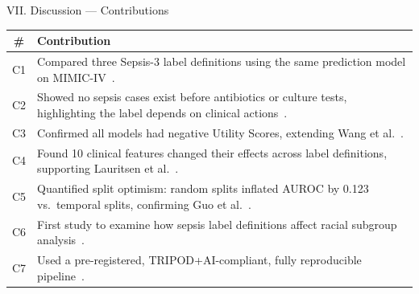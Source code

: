\begin{frame}{VII. Discussion --- Contributions}
\footnotesize\renewcommand{\arraystretch}{1.15}
\begin{center}
\begin{tabular}{cp{11cm}}
\toprule
\textbf{\#} & \textbf{Contribution} \\
\midrule
C1 & Compared three Sepsis-3 label definitions using the same prediction
     model on MIMIC-IV~\cite{cohen2024subtle}. \\
C2 & Showed no sepsis cases exist before antibiotics or culture tests,
     highlighting the label depends on clinical
     actions~\cite{kamran2024evaluation}. \\
C3 & Confirmed all models had negative Utility Scores, extending
     Wang et al.~\cite{wang2025srpm}. \\
C4 & Found 10 clinical features changed their effects across label
     definitions, supporting Lauritsen et al.~\cite{lauritsen2021framing}. \\
C5 & Quantified split optimism: random splits inflated AUROC by 0.123
     vs.\ temporal splits, confirming Guo et al.~\cite{guo2022temporal}. \\
C6 & First study to examine how sepsis label definitions affect racial
     subgroup analysis~\cite{wang2022equity}. \\
C7 & Used a pre-registered, TRIPOD+AI-compliant, fully reproducible
     pipeline~\cite{collins2024tripodai}. \\
\bottomrule
\end{tabular}
\end{center}
\end{frame}


